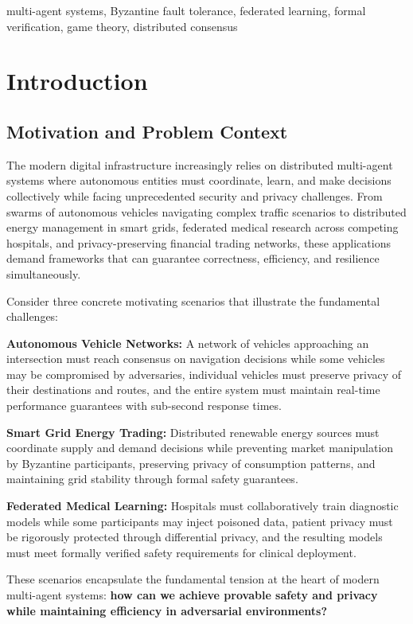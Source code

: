 \documentclass[conference]{IEEEtran}
\begin{document}
\begin{IEEEkeywords}
multi-agent systems, Byzantine fault tolerance, federated learning, formal verification, game theory, distributed consensus
\end{IEEEkeywords}

\section{Introduction}

\subsection{Motivation and Problem Context}

The modern digital infrastructure increasingly relies on distributed multi-agent systems where autonomous entities must coordinate, learn, and make decisions collectively while facing unprecedented security and privacy challenges. From swarms of autonomous vehicles navigating complex traffic scenarios to distributed energy management in smart grids, federated medical research across competing hospitals, and privacy-preserving financial trading networks, these applications demand frameworks that can guarantee correctness, efficiency, and resilience simultaneously.

Consider three concrete motivating scenarios that illustrate the fundamental challenges:

\textbf{Autonomous Vehicle Networks:} A network of vehicles approaching an intersection must reach consensus on navigation decisions while some vehicles may be compromised by adversaries, individual vehicles must preserve privacy of their destinations and routes, and the entire system must maintain real-time performance guarantees with sub-second response times.

\textbf{Smart Grid Energy Trading:} Distributed renewable energy sources must coordinate supply and demand decisions while preventing market manipulation by Byzantine participants, preserving privacy of consumption patterns, and maintaining grid stability through formal safety guarantees.

\textbf{Federated Medical Learning:} Hospitals must collaboratively train diagnostic models while some participants may inject poisoned data, patient privacy must be rigorously protected through differential privacy, and the resulting models must meet formally verified safety requirements for clinical deployment.

These scenarios encapsulate the fundamental tension at the heart of modern multi-agent systems: \textbf{how can we achieve provable safety and privacy while maintaining efficiency in adversarial environments?}
\end{document}
